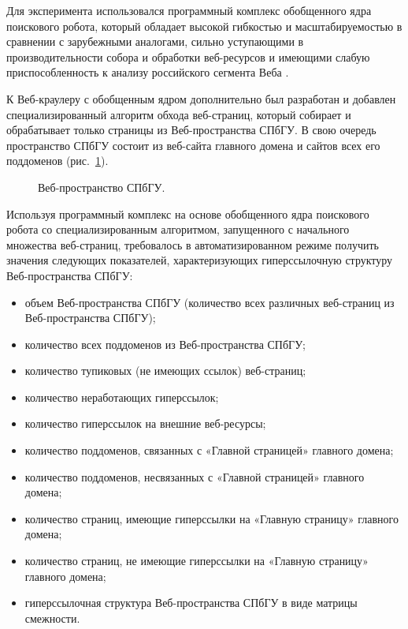  Для эксперимента использовался программный комплекс обобщенного ядра поискового робота, который обладает высокой гибкостью и масштабируемостью в сравнении с зарубежными аналогами, сильно уступающими в производительности собора и обработки веб-ресурсов и имеющими слабую приспособленность к анализу российского сегмента Веба \cite{BlekanovSergeevMartynenko}. 
 
 К Веб-краулеру с обобщенным ядром дополнительно был разработан и добавлен специализированный алгоритм обхода веб-страниц, который собирает и обрабатывает только страницы из Веб-пространства СПбГУ. В свою очередь пространство СПбГУ состоит из веб-сайта главного домена и сайтов всех его поддоменов (рис.~\cref{fig:spbuWebSpace}).
 
\begin{figure}[ht]
    \caption{Веб-пространство СПбГУ.}\label{fig:spbuWebSpace}
\end{figure}

Используя программный комплекс на основе обобщенного ядра поискового робота со специализированным алгоритмом, запущенного с начального множества веб-страниц, требовалось в автоматизированном режиме получить значения следующих показателей, характеризующих гиперссылочную структуру Веб-пространства СПбГУ:
\begin{itemize}
	\item объем Веб-пространства СПбГУ (количество всех различных веб-страниц из Веб-пространства СПбГУ);
	\item количество всех поддоменов из Веб-пространства СПбГУ; 
	\item количество тупиковых (не имеющих ссылок) веб-страниц; 
	\item количество неработающих гиперссылок; 
	\item количество гиперссылок на внешние веб-ресурсы; 
	\item количество поддоменов, связанных с «Главной страницей» главного домена; 
	\item количество поддоменов, несвязанных с «Главной страницей» главного домена; 
	\item количество страниц, имеющие гиперссылки на «Главную страницу» главного домена; 
	\item количество страниц, не имеющие гиперссылки на «Главную страницу» главного домена; 
	\item гиперссылочная структура Веб-пространства СПбГУ в виде матрицы смежности. 
\end{itemize}

